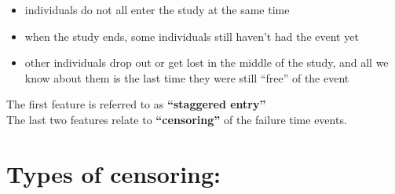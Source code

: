 \documentclass[11pt,slidesonly,semrot,portrait,palatino]{book}
\begin{document}
\begin{itemize}
\item individuals do not all enter the study at the same time
\item when the study ends, some individuals still haven't had
the event yet
\item other individuals drop out or get lost in the middle of
the study, and all we know about them is the last time they
were still ``free'' of the event
\end{itemize}
The first feature is referred to as {\bf ``staggered entry''}
\\[2ex]
The last two features relate to {\bf ``censoring''} of the
failure time events.
\section{Types of censoring:}
\end{document}
